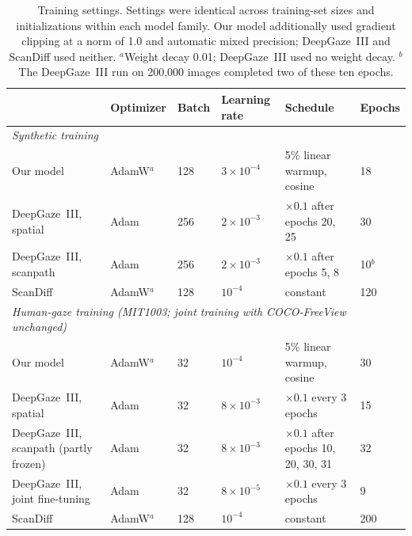 \begin{table}[t]
  \centering
  \small
  \begin{tabular}{llllll}
    \toprule
    & Optimizer & Batch & Learning rate & Schedule & Epochs \\
    \midrule
    \multicolumn{6}{l}{\textit{Synthetic training}} \\
    Our model       & AdamW$^{a}$ & 128 & $3\times10^{-4}$ & 5\% linear warmup, cosine & 18 \\
    DeepGaze~III, spatial  & Adam & 256 & $2\times10^{-3}$ & $\times0.1$ after epochs 20, 25 & 30 \\
    DeepGaze~III, scanpath & Adam & 256 & $2\times10^{-3}$ & $\times0.1$ after epochs 5, 8 & 10$^{b}$ \\
    ScanDiff        & AdamW$^{a}$ & 128 & $10^{-4}$ & constant & 120 \\
    \midrule
    \multicolumn{6}{l}{\textit{Human-gaze training (MIT1003; joint training with COCO-FreeView unchanged)}} \\
    Our model       & AdamW$^{a}$ & 32 & $10^{-4}$ & 5\% linear warmup, cosine & 30 \\
    DeepGaze~III, spatial  & Adam & 32 & $8\times10^{-3}$ & $\times0.1$ every 3 epochs & 15 \\
    DeepGaze~III, scanpath (partly frozen) & Adam & 32 & $8\times10^{-3}$ & $\times0.1$ after epochs 10, 20, 30, 31 & 32 \\
    DeepGaze~III, joint fine-tuning & Adam & 32 & $8\times10^{-5}$ & $\times0.1$ every 3 epochs & 9 \\
    ScanDiff        & AdamW$^{a}$ & 128 & $10^{-4}$ & constant & 200 \\
    \bottomrule
  \end{tabular}
  \caption{Training settings. Settings were identical across training-set sizes and initializations within each model family. Our model additionally used gradient clipping at a norm of 1.0 and automatic mixed precision; DeepGaze~III and ScanDiff used neither. $^{a}$Weight decay 0.01; DeepGaze~III used no weight decay. $^{b}$The DeepGaze~III run on 200,000 images completed two of these ten epochs.}
  \label{tab:training-settings}
\end{table}
